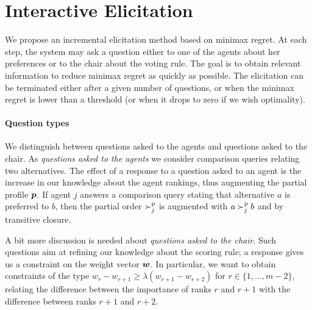 \documentclass[runningheads]{llncs}
\begin{document}
\section{Interactive Elicitation} 
\label{sec:elicit}
We propose an incremental elicitation method based on minimax regret.
At each step, the system may ask a question either to one of the agents about her preferences or to the chair about the voting rule. 
The goal is to obtain relevant information to reduce minimax regret as quickly as possible.
The elicitation can be terminated either after a given number of questions, or when the minimax regret is lower than a threshold (or when it drops to zero if we wish optimality).



\paragraph{Question types}
We distinguish between questions asked to the agents and questions asked to the chair.
As {\em questions asked to the agents} we consider comparison queries relating two alternatives.
The effect of a response to a question asked to an agent is the increase in our knowledge about the agent rankings, thus augmenting the partial profile ${\bm{p}}$. 
If agent $j$ answers a comparison query stating that alternative $a$ is preferred to $b$, then the partial order $\succ^\text{p}_j$ is augmented with $a \succ^\text{p}_j b$ and by transitive closure.

A bit more discussion is needed about {\em questions asked to the chair}.
Such questions aim at refining our knowledge about the scoring rule; a response gives us a constraint on the weight vector $\bm{w}$.
In particular, we want to obtain constraints of the type $w_{r} - w_{r+1} \geq \lambda (w_{r+1} - w_{r+2})$ for $r \in \{1,\ldots,m-2\}$, relating the difference between the importance of ranks $r$ and $r+1$ with the difference between ranks $r+1$ and $r+2$.
\end{document}
